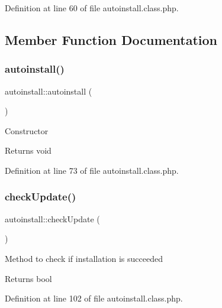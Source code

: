 Definition at line 60 of file autoinstall.\+class.\+php.



\subsection{Member Function Documentation}
\mbox{\label{classautoinstall_aa76d5fcbf6ac9450b810acefa4b85a51}} 
\subsubsection{\texorpdfstring{autoinstall()}{autoinstall()}}
{\footnotesize\ttfamily autoinstall\+::autoinstall (\begin{DoxyParamCaption}{ }\end{DoxyParamCaption})}

Constructor

\begin{DoxyReturn}{Returns}
void 
\end{DoxyReturn}


Definition at line 73 of file autoinstall.\+class.\+php.

\mbox{\label{classautoinstall_a74f260b0d1254c8e4dbd69b532072a95}} 
\subsubsection{\texorpdfstring{check\+Update()}{checkUpdate()}}
{\footnotesize\ttfamily autoinstall\+::check\+Update (\begin{DoxyParamCaption}{ }\end{DoxyParamCaption})}

Method to check if installation is succeeded

\begin{DoxyReturn}{Returns}
bool 
\end{DoxyReturn}


Definition at line 102 of file autoinstall.\+class.\+php.

\mbox{\label{classautoinstall_ad783aa6031577dca5fdcc7f6ea61f452}} 
